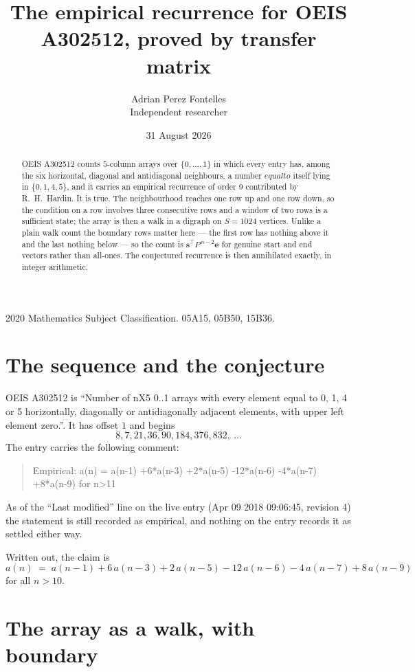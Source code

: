 \documentclass[11pt,a4paper]{article}
\title{The empirical recurrence for OEIS A302512, proved by transfer matrix}
\author{Adrian Perez Fontelles\\ \small Independent researcher}
\date{31 August 2026}
\theoremstyle{plain}
\theoremstyle{definition}
\begin{document}
\maketitle

\begin{abstract}
OEIS A302512 counts $5$-column arrays over $\{0,\dots,1\}$ in which every entry has,
among the six horizontal, diagonal and antidiagonal neighbours, a number $equal to$ itself lying in $\{0,1,4,5\}$, and it carries an empirical
recurrence of order $9$ contributed by R.~H.~Hardin. It is true. The neighbourhood
reaches one row up and one row down, so the condition on a row involves three consecutive
rows and a window of two rows is a sufficient state; the array is then a walk in a digraph
on $S=1024$ vertices. Unlike a plain walk count the boundary rows matter here --- the first
row has nothing above it and the last nothing below --- so the count is
$\mathbf{s}^{\!\top}P^{\,n-2}\mathbf{e}$ for genuine start and end vectors rather than
all-ones. The conjectured recurrence is then annihilated exactly, in integer arithmetic.
\end{abstract}

\noindent\small 2020 Mathematics Subject Classification. 05A15, 05B50, 15B36.\normalsize

\section{The sequence and the conjecture}

OEIS A302512 is ``Number of nX5 0..1 arrays with every element equal to 0, 1, 4 or 5 horizontally, diagonally or antidiagonally adjacent elements, with upper left element zero.''. It has offset
$1$ and begins
\[
8, 7, 21, 36, 90, 184, 376, 832,\ \dots
\]
The entry carries the following comment:
\begin{quote}\small
Empirical: a(n) = a(n-1) +6*a(n-3) +2*a(n-5) -12*a(n-6) -4*a(n-7) +8*a(n-9) for n>11
\end{quote}
As of the ``Last modified'' line on the live entry (Apr 09 2018 09:06:45, revision
4) the statement is still recorded as empirical, and nothing on the entry
records it as settled either way.

Written out, the claim is
\begin{equation}\label{eq:conj}
a(n)\;=\;a(n-1) + 6\,a(n-3) + 2\,a(n-5) - 12\,a(n-6) - 4\,a(n-7) + 8\,a(n-9)
\end{equation}
for all $n>10$.

\section{The array as a walk, with boundary}
\end{document}
